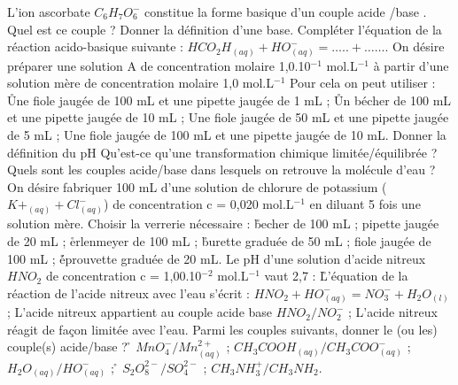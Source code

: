 
\q
L'ion ascorbate $C_6H_7O_6^{-}$ constitue la forme basique d'un couple acide /base . 
Quel est ce couple ? 
\q
Donner la définition d'une base.
\q
Compléter l'équation de la réaction acido-basique suivante :
$HCO_2H_{(aq)}+ HO^{-}_{(aq)} =       …..     +  …….$
\q	
On désire préparer une solution A de concentration molaire 1,0.10$^{-1}$ mol.L$^{-1}$ à partir  d'une solution mère de concentration molaire 1,0 mol.L$^{-1}$  Pour cela on peut utiliser :
\r
Une fiole jaugée de 100 mL et une pipette jaugée de 1 mL ;
\r
Un bécher de 100 mL et une pipette jaugée de 10 mL ;
\rv
Une fiole jaugée de 50 mL et une pipette jaugée de 5 mL ;
\rv
Une fiole jaugée de 100 mL et une pipette jaugée de 10 mL.
\q	
 Donner la définition du pH
\q	
  Qu'est-ce qu'une transformation chimique limitée/équilibrée ?
\q	
  Quels sont les couples acide/base dans lesquels on retrouve la molécule d'eau   ?
\q	
 On désire fabriquer 100 mL d'une solution de chlorure de potassium ($K+_{(aq)} + Cl^{-}_{(aq)}$) de concentration   c = 0,020 mol.L$^{-1}$ en diluant 5 fois une solution mère. Choisir la verrerie nécessaire :
\r
  becher de 100 mL ;		
\rv
    pipette jaugée de 20 mL ;
\r
  erlenmeyer de 100 mL ;	
\r
  	  burette graduée de 50 mL ;
\rv
  fiole jaugée de 100 mL ; 
\r
              	  éprouvette graduée de 20 mL.
\q
   	Le pH d'une solution d'acide nitreux $HNO_2$ de concentration c = 1,00.10$^{-2}$ mol.L$^{-1}$ vaut 2,7 :
\r  
L'équation de la réaction de l'acide nitreux avec l'eau s'écrit : 
$HNO_2 + HO^{-}_{(aq)}  = NO_3^{-} + H_2O_(l)$ ;
\rv
  L'acide nitreux appartient au couple acide base $HNO_2/NO_2^-$ ;
\rv
  L'acide nitreux réagit de façon limitée avec l'eau.
\q	
   Parmi les couples suivants, donner le (ou les) couple(s) acide/base ?
\r
 	$MnO_4^- / Mn^{2+}_{(aq)}$ ;
\rv
 	$CH_3COOH_{(aq)} / CH_3COO^{-}_{(aq)}$ ;
\rv
 	$H_2O_{(aq)} / HO^{-}_{(aq)}$ ;
\r
 	$S_2O_8^{2-}/ SO_4^{2-}$ ;
\rv
 	$CH_3NH_3^+ / CH_3NH_2$.

